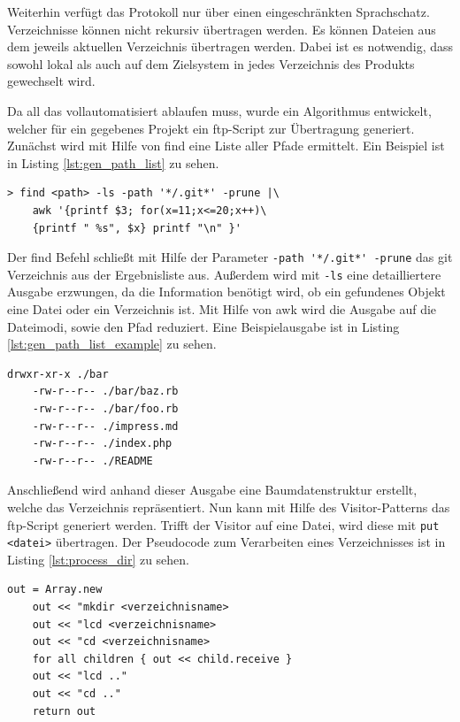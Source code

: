 Weiterhin verfügt das Protokoll nur über einen eingeschränkten Sprachschatz. Verzeichnisse können nicht rekursiv übertragen werden. Es können Dateien aus dem jeweils aktuellen Verzeichnis übertragen werden. Dabei ist es notwendig, dass sowohl lokal als auch auf dem Zielsystem in jedes Verzeichnis des Produkts gewechselt wird.

Da all das vollautomatisiert ablaufen muss, wurde ein Algorithmus entwickelt, welcher für ein gegebenes Projekt ein \gls{ftp}-Script zur Übertragung generiert. Zunächst wird mit Hilfe von find eine Liste aller Pfade ermittelt. Ein Beispiel ist in Listing \ref{lst:gen_path_list} zu sehen.

\begin{lstlisting}[caption=Generiere Liste aller Pfade,label={lst:gen_path_list}]
> find <path> -ls -path '*/.git*' -prune |\
	awk '{printf $3; for(x=11;x<=20;x++)\
	{printf " %s", $x} printf "\n" }'
\end{lstlisting}

Der find Befehl schließt mit Hilfe der Parameter \lstinline!-path '*/.git*' -prune! das git Verzeichnis aus der Ergebnisliste aus. Außerdem wird mit \lstinline!-ls! eine detailliertere Ausgabe erzwungen, da die Information benötigt wird, ob ein gefundenes Objekt eine Datei oder ein Verzeichnis ist. Mit Hilfe von awk wird die Ausgabe auf die Dateimodi, sowie den Pfad reduziert. Eine Beispielausgabe ist in Listing \ref{lst:gen_path_list_example} zu sehen.

\begin{lstlisting}[caption=Beispielausgabe für gefundene Pfade,label={lst:gen_path_list_example}]
	drwxr-xr-x ./bar
	-rw-r--r-- ./bar/baz.rb
	-rw-r--r-- ./bar/foo.rb
	-rw-r--r-- ./impress.md
	-rw-r--r-- ./index.php
	-rw-r--r-- ./README
\end{lstlisting}
     
Anschließend wird anhand dieser Ausgabe eine Baumdatenstruktur erstellt, welche das Verzeichnis repräsentiert. Nun kann mit Hilfe des Visitor-Patterns das \gls{ftp}-Script generiert werden. Trifft der Visitor auf eine Datei, wird diese mit \lstinline!put <datei>! übertragen. Der Pseudocode zum Verarbeiten eines Verzeichnisses ist in Listing \ref{lst:process_dir} zu sehen.

\begin{lstlisting}[caption=Verarbeitung eines Verzeichnisses,label={lst:process_dir}]
	out = Array.new
	out << "mkdir <verzeichnisname>
	out << "lcd <verzeichnisname>
	out << "cd <verzeichnisname>
	for all children { out << child.receive }
	out << "lcd .."
	out << "cd .."
	return out
\end{lstlisting}

